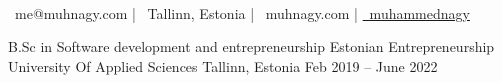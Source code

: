 \documentclass[]{awesome-cv}
\begin{document}
    
\begin{center}
	  \\
	\vspace{1mm}
	{\faEnvelope\ me@muhnagy.com} | {\faMapMarker\ Tallinn, Estonia} | {\faLink\ muhnagy.com} | \href{http://www.github.com/muhammednagy}{\faGithub\ muhammednagy}
\end{center}
\begin{cventries}
	\cventry
	{B.Sc in Software development and entrepreneurship}
	{Estonian Entrepreneurship University Of Applied Sciences}
	{Tallinn, Estonia}
	{Feb 2019 – June 2022}
	{}
\end{cventries}
\end{document}
